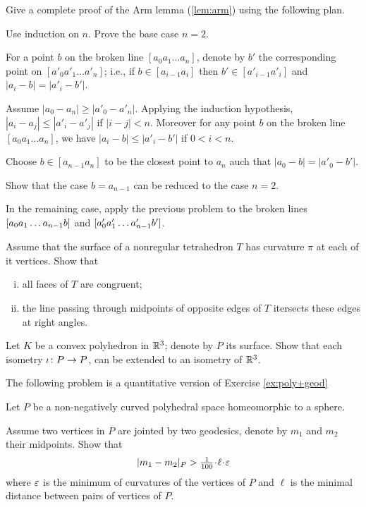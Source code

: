 \begin{pr}\label{pr:arm}
Give a complete proof of the Arm lemma (\ref{lem:arm}) using the following plan.

Use induction on $n$.
Prove the base case $n=2$.

For a point $b$ on the broken line $[a_0a_1\dots a_n]$, 
denote by $b'$ the corresponding point on $[a'_0a'_1\dots a'_n]$;
i.e., if $b\in[a_{i-1}a_i]$ then $b'\in[a'_{i-1}a'_i]$ and $|a_i-b|=|a'_i-b'|$.

Assume  $|a_0-a_n|\ge |a'_0-a'_n|$.
Applying the induction hypothesis,  $|a_i-a_j|\le |a'_i-a'_j|$ if $|i-j|<n$.
Moreover for any point $b$ on the broken line $[a_0a_1\dots a_n]$, we have
$|a_i-b|\le |a'_i-b'|$ if $0<i<n$.

Choose $b\in [a_{n-1}a_n]$ to be the closest point to $a_n$ auch that
$|a_0-b|=|a'_0-b'|$.

Show that the case $b= a_{n-1}$ can be reduced to the case $n=2$.

In the remaining case,  apply the previous problem to the broken lines
$[a_0a_1\z\dots a_{n-1}b]$ and $[a'_0a'_1\z\dots a'_{n-1}b']$.
\end{pr}

\begin{pr}\label{pr:tetrahedron} 
Assume that the surface of a nonregular tetrahedron $T$ has curvature $\pi$ at each of it vertices.
Show that 

\begin{enumerate}[i)]
\item all faces of $T$ are congruent;
\item the line passing through midpoints of opposite edges of $T$ itersects these edges at right angles. 
\end{enumerate}
 
\end{pr}



\begin{pr}\label{pr:K-P-simmetry}
Let $K$ be a convex polyhedron in $\mathbb{R}^3$;
denote by $P$ its surface.
Show that each isometry $\iota\:P\z\to P$,
can be extended to an isometry of $\mathbb{R}^3$. 
\end{pr}

The following problem is a quantitative version of Exercise \ref{ex:poly+geod}

\begin{pr}\label{pr:poly+geod+}
Let $P$ be a non-negatively curved polyhedral space homeomorphic to a sphere.

Assume two vertices in $P$ are jointed by two geodesics,
denote by $m_1$ and $m_2$ their midpoints.
Show that
$$|m_1-m_2|_P> \tfrac1{100}\cdot\ell\cdot\eps$$
where $\varepsilon$ is the minimum of curvatures of the vertices of $P$
and $\ell$ is the minimal distance between pairs of vertices of $P$.
\end{pr}



